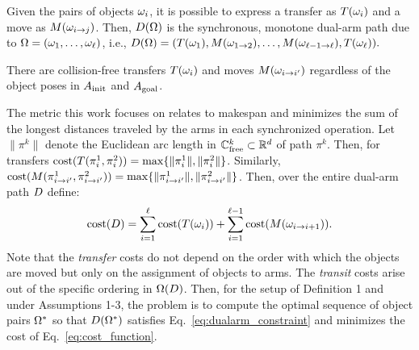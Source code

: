\noindent Given the pairs of objects ${\omega}_i$, it is possible to express a transfer as $T({\omega}_i)$ and a move as $M({\omega}_{i\rightarrow j})$.  Then, $D({{\Omega}})$ is the synchronous, monotone dual-arm path due to ${{\Omega}} = ({\omega}_1, \ldots, {\omega}_{\ell})$, i.e., $D({{\Omega}}) = (T({\omega}_1),M({\omega}_{1\rightarrow 2}),\ldots,M({\omega}_{\ell-1\rightarrow \ell}),T({\omega}_\ell)).$

\vspace{-.1in}
{ There are collision-free transfers $T({\omega}_i)$ and moves $M({\omega}_{i\rightarrow i^{\prime}})$ regardless of the object poses in $A_{\rm init}$ and $A_{\rm goal}$.}

The metric this work focuses on relates to makespan and minimizes the sum of the longest distances traveled by the arms in each synchronized operation. Let $ \| \pi^k \| $ denote the Euclidean arc length in $\mathbb{C}_{{\rm free}}^k  \subset \mathbb{R}^d$ of path $ \pi^k $. Then, for transfers $\textup{cost}( T(\pi^1_i,\pi^2_i) ) = \max\{ \|\pi^1_i\|, \|\pi^2_i\| \}$. Similarly, $\textup{cost}( M(\pi^1_{i\rightarrow i^{\prime}},\pi^2_{i\rightarrow i^{\prime}}) ) = \max\{ \|\pi^1_{i\rightarrow i'}\|, \|\pi^2_{i\rightarrow i'}\| \}$. Then, over the entire dual-arm path $ D $ define:
\vspace{-.15in}
\begin{equation}
\cost(\D) 
= \sum_{i=1}^{\ell}   \cost(T(\coma_i))   + \sum_{i=1}^{\ell-1}   \cost(M(\coma_{i\rightarrow i+1})). 
\vspace{-.1in}
\label{eq:cost_function}
\end{equation}
Note that the \textit{transfer} costs do not depend on the order with which the objects are moved but only on the assignment of objects to arms. The \textit{transit} costs arise out of the specific ordering in $ {{\Omega}}(D)$. 
Then, for the setup of Definition 1 and under Assumptions 1-3, the problem is to compute the optimal sequence of object pairs ${{\Omega}}^*$ so that $D({{\Omega}}^*)$ satisfies Eq.~\ref{eq:dualarm_constraint} and minimizes the cost of Eq.~\ref{eq:cost_function}.

